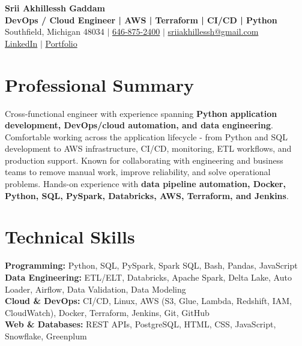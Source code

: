 \documentclass[letterpaper,10pt]{article}
\begin{document}
\fontsize{9.35pt}{10.45pt}\selectfont

\begin{center}
    {\LARGE \textbf{Srii Akhillessh Gaddam}} \\[-1pt]
    \textbf{DevOps / Cloud Engineer | AWS | Terraform | CI/CD | Python} \\[2pt]
    Southfield, Michigan 48034 $|$
    \href{tel:6468752400}{646-875-2400} $|$
    \href{mailto:sriiakhillessh@gmail.com}{sriiakhillessh@gmail.com} \\[1pt]
    \href{https://www.linkedin.com/in/srii-akhiilessh-gaddam-b48668191/}{LinkedIn} $|$
    \href{https://sriiakhillesshg.github.io/portfolio/}{Portfolio}
\end{center}
\vspace{-8pt}

\section{Professional Summary}
\small{Cross-functional engineer with experience spanning \textbf{Python application development, DevOps/cloud automation, and data engineering}. Comfortable working across the application lifecycle - from Python and SQL development to AWS infrastructure, CI/CD, monitoring, ETL workflows, and production support. Known for collaborating with engineering and business teams to remove manual work, improve reliability, and solve operational problems. Hands-on experience with \textbf{data pipeline automation, Docker, Python, SQL, PySpark, Databricks, AWS, Terraform, and Jenkins}.}

\section{Technical Skills}
\small{
\textbf{Programming:} Python, SQL, PySpark, Spark SQL, Bash, Pandas, JavaScript \\
\textbf{Data Engineering:} ETL/ELT, Databricks, Apache Spark, Delta Lake, Auto Loader, Airflow, Data Validation, Data Modeling \\
\textbf{Cloud \& DevOps:} CI/CD, Linux, AWS (S3, Glue, Lambda, Redshift, IAM, CloudWatch), Docker, Terraform, Jenkins, Git, GitHub \\
\textbf{Web \& Databases:} REST APIs, PostgreSQL, HTML, CSS, JavaScript, Snowflake, Greenplum
}
\end{document}
